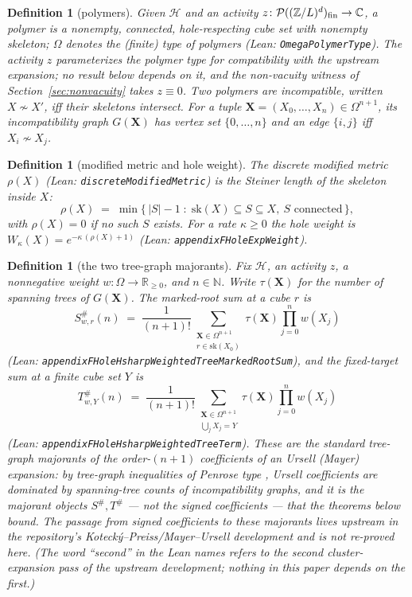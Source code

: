 \documentclass[11pt]{article}
\newtheorem{definition}[theorem]{Definition}
\newcommand{\lean}[1]{\texttt{#1}}
\newcommand{\ZL}{\mathbb{Z}/L}
\newcommand{\holes}{\mathcal{H}}
\newcommand{\skel}{\mathrm{sk}}
\newcommand{\Poly}{\Omega}
\begin{document}
\begin{definition}[polymers]\label{def:polymers}
Given $\holes$ and an activity $z \colon \mathcal{P}((\ZL)^d)_{\rm
fin} \to \mathbb{C}$, a \emph{polymer} is a nonempty, connected,
hole-respecting cube set with nonempty skeleton; $\Poly$ denotes the
(finite) type of polymers (Lean: \lean{OmegaPolymerType}).  The
activity $z$ parameterizes the polymer type for compatibility with
the upstream expansion; no result below depends on it, and the
non-vacuity witness of Section~\ref{sec:nonvacuity} takes $z \equiv
0$.  Two
polymers are \emph{incompatible}, written $X \nsim X'$, iff their
skeletons intersect.  For a tuple $\mathbf{X} = (X_0, \dots, X_n) \in
\Poly^{n+1}$, its \emph{incompatibility graph} $G(\mathbf{X})$ has
vertex set $\{0,\dots,n\}$ and an edge $\{i,j\}$ iff $X_i \nsim X_j$.
\end{definition}

\begin{definition}[modified metric and hole weight]\label{def:metric}
The \emph{discrete modified metric} $\rho(X)$ (Lean:
\lean{discreteModifiedMetric}) is the Steiner length of the skeleton
inside $X$:
\[
\rho(X) \;=\; \min\bigl\{\, |S| - 1 \;:\; \skel(X) \subseteq S
\subseteq X,\ S \text{ connected} \,\bigr\},
\]
with $\rho(X) = 0$ if no such $S$ exists.  For a rate $\kappa \ge 0$
the \emph{hole weight} is
$W_\kappa(X) = e^{-\kappa\,(\rho(X)+1)}$
(Lean: \lean{appendixFHoleExpWeight}).
\end{definition}

\begin{definition}[the two tree-graph majorants]\label{def:sums}
Fix $\holes$, an activity $z$, a nonnegative weight $w \colon \Poly
\to \mathbb{R}_{\ge 0}$, and $n \in \mathbb{N}$.  Write
$\tau(\mathbf{X})$ for the number of spanning trees of
$G(\mathbf{X})$.  The \emph{marked-root sum} at a cube $r$ is
\[
S^{\#}_{w,r}(n) \;=\; \frac{1}{(n+1)!}
\sum_{\substack{\mathbf{X} \in \Poly^{n+1} \\ r \in \skel(X_0)}}
\tau(\mathbf{X}) \prod_{j=0}^{n} w(X_j)
\]
(Lean: \lean{appendixFHoleHsharpWeightedTreeMarkedRootSum}), and the
\emph{fixed-target sum} at a finite cube set $Y$ is
\[
T^{\#}_{w,Y}(n) \;=\; \frac{1}{(n+1)!}
\sum_{\substack{\mathbf{X} \in \Poly^{n+1} \\ \bigcup_j X_j = Y}}
\tau(\mathbf{X}) \prod_{j=0}^{n} w(X_j)
\]
(Lean: \lean{appendixFHoleHsharpWeightedTreeTerm}).
These are the standard tree-graph majorants of the order-$(n+1)$
coefficients of an Ursell (Mayer) expansion: by
tree-graph inequalities of Penrose type \cite{Penrose67,AR95}, Ursell
coefficients are dominated by spanning-tree counts of incompatibility
graphs, and it is the majorant objects $S^{\#}, T^{\#}$ --- not the
signed coefficients --- that the theorems below bound.  The passage
from signed coefficients to these majorants lives upstream in the
repository's Kotecký--Preiss/Mayer--Ursell development and is not
re-proved here.  (The word ``second'' in the Lean names refers to the
second cluster-expansion pass of the upstream development; nothing in
this paper depends on the first.)
\end{definition}
\end{document}
